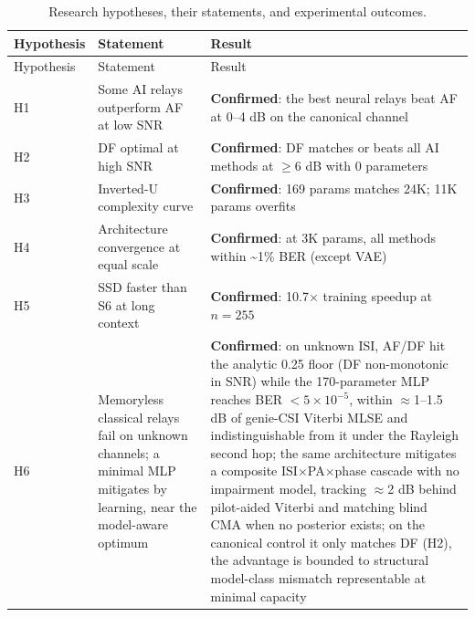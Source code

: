 \begin{longtable}[]{@{}
  >{\raggedright\arraybackslash}p{}
  >{\raggedright\arraybackslash}p{}
  >{\raggedright\arraybackslash}p{}@{}}
\caption{Research hypotheses, their statements, and experimental outcomes.}\label{tbl:table33}\tabularnewline
\toprule\noalign{}
\begin{minipage}[b]{\linewidth}\raggedright
Hypothesis
\end{minipage} & \begin{minipage}[b]{\linewidth}\raggedright
Statement
\end{minipage} & \begin{minipage}[b]{\linewidth}\raggedright
Result
\end{minipage} \\
\midrule\noalign{}
\endfirsthead
\toprule\noalign{}
\begin{minipage}[b]{\linewidth}\raggedright
Hypothesis
\end{minipage} & \begin{minipage}[b]{\linewidth}\raggedright
Statement
\end{minipage} & \begin{minipage}[b]{\linewidth}\raggedright
Result
\end{minipage} \\
\midrule\noalign{}
\endhead
\bottomrule\noalign{}
\endlastfoot
H1 & Some AI relays outperform AF at low SNR & \textbf{Confirmed}: the best neural relays beat AF at 0--4 dB on the canonical channel \\
H2 & DF optimal at high SNR & \textbf{Confirmed}: DF matches or beats all AI methods at \(\geq 6\) dB with 0 parameters \\
H3 & Inverted-U complexity curve & \textbf{Confirmed}: 169 params matches 24K; 11K params overfits \\
H4 & Architecture convergence at equal scale & \textbf{Confirmed}: at 3K params, all methods within \textasciitilde1\% BER (except VAE) \\
H5 & SSD faster than S6 at long context & \textbf{Confirmed}: 10.7× training speedup at \(n = 255\) \\
H6 & Memoryless classical relays fail on unknown channels; a minimal MLP mitigates by learning, near the model-aware optimum & \textbf{Confirmed}: on unknown ISI, AF/DF hit the analytic 0.25 floor (DF non-monotonic in SNR) while the 170-parameter MLP reaches BER $<5\times10^{-5}$, within $\approx$1--1.5 dB of genie-CSI Viterbi MLSE and indistinguishable from it under the Rayleigh second hop; the same architecture mitigates a composite ISI$\times$PA$\times$phase cascade with no impairment model, tracking $\approx$2 dB behind pilot-aided Viterbi and matching blind CMA when no posterior exists; on the canonical control it only matches DF (H2), the advantage is bounded to structural model-class mismatch representable at minimal capacity \\
\end{longtable}

